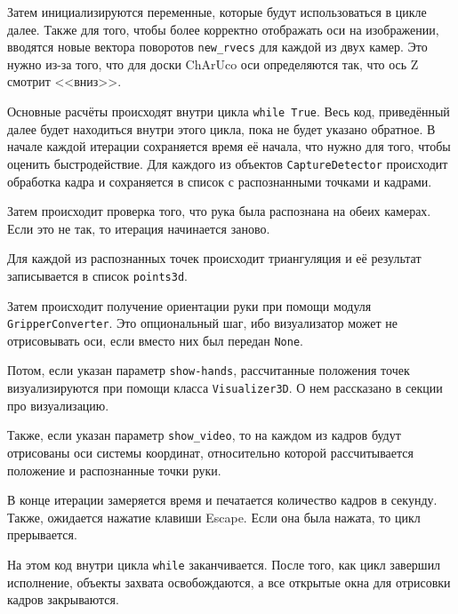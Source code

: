 \documentclass[14pt, a4paper]{extarticle}
\begin{document}
Затем инициализируются переменные, которые будут использоваться в цикле далее.
Также для того, чтобы более корректно отображать оси на изображении, вводятся
новые вектора поворотов \texttt{new\_rvecs} для каждой из двух камер. Это нужно
из-за того, что для доски ChArUco оси определяются так, что ось Z смотрит <<вниз>>.

Основные расчёты происходят внутри цикла \texttt{while True}. Весь код,
приведённый далее будет находиться внутри этого цикла, пока не будет указано
обратное. В начале каждой итерации сохраняется время её начала, что нужно для
того, чтобы оценить быстродействие. Для каждого из объектов
\texttt{CaptureDetector} происходит обработка кадра и сохраняется в список с
распознанными точками и кадрами.

Затем происходит проверка того, что рука была распознана на обеих камерах. Если
это не так, то итерация начинается заново.

Для каждой из распознанных точек происходит триангуляция и её результат
записывается в список \texttt{points3d}.

Затем происходит получение ориентации руки при помощи модуля\\
\texttt{GripperConverter}. Это опциональный шаг, ибо визуализатор может не
отрисовывать оси, если вместо них был передан \texttt{None}.

Потом, если указан параметр \texttt{show-hands}, рассчитанные положения точек визуализируются при помощи класса
\texttt{Visualizer3D}. О нем рассказано в секции про визуализацию.

Также, если указан параметр \texttt{show\_video}, то на каждом из кадров
будут отрисованы оси системы координат, относительно которой рассчитывается
положение и распознанные точки руки.

В конце итерации замеряется время и печатается количество кадров в секунду.
Также, ожидается нажатие клавиши Escape. Если она была нажата, то цикл
прерывается.

На этом код внутри цикла \texttt{while} заканчивается. После того, как цикл
завершил исполнение, объекты захвата освобождаются, а все открытые окна для
отрисовки кадров закрываются. 
\end{document}
